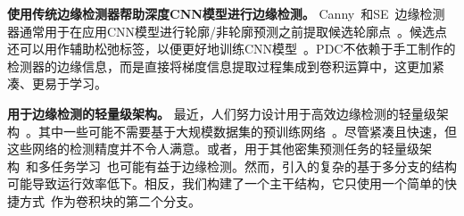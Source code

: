 \documentclass[10pt,twocolumn,letterpaper]{article}
\begin{document}
\noindent \textbf{使用传统边缘检测器帮助深度CNN模型进行边缘检测。} \quad Canny~\cite{canny1986computational}和SE~\cite{dollar2014se}边缘检测器通常用于在应用CNN模型进行轮廓/非轮廓预测之前提取候选轮廓点~\cite{bertasius2015deepedge, bertasius2015hfl}。候选点还可以用作辅助松弛标签，以便更好地训练CNN模型~\cite{liu2016relaxed}。PDC不依赖于手工制作的检测器的边缘信息，而是直接将梯度信息提取过程集成到卷积运算中，这更加紧凑、更易于学习。

\vspace{0.3em}
\noindent \textbf{用于边缘检测的轻量级架构。} \quad 最近，人们努力设计用于高效边缘检测的轻量级架构~\cite{wibisono2020fined, wibisono2020traditional, poma2020dense}。其中一些可能不需要基于大规模数据集的预训练网络~\cite{poma2020dense}。尽管紧凑且快速，但这些网络的检测精度并不令人满意。或者，用于其他密集预测任务的轻量级架构~\cite{gao2020100k, wu2020cgnet, paszke2016enet, li2019dabnet, mehta2019espnetv2, yu2018bisenet}和多任务学习~\cite{kokkinos2017ubernet, liu2020dynamicintegration}也可能有益于边缘检测。然而，引入的复杂的基于多分支的结构可能导致运行效率低下。相反，我们构建了一个主干结构，它只使用一个简单的快捷方式~\cite{he2016residual}作为卷积块的第二个分支。
\end{document}

